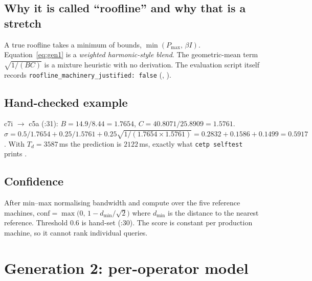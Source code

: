 \subsection{Why it is called ``roofline'' and why that is a stretch}
A true roofline takes a minimum of bounds, $\min(P_{\max},\,\beta I)$. Equation~\eqref{eq:gen1} is a
\emph{weighted harmonic-style blend}. The geometric-mean term $\sqrt{1/(BC)}$ is a mixture heuristic with no
derivation. The evaluation script itself records \texttt{roofline\_machinery\_justified: false}
(, \evFILE).

\subsection{Hand-checked example}
c7i $\to$ c5a (:31): $B=14.9/8.44=1.7654$, $C=40.8071/25.8909=1.5761$.
$\sigma=0.5/1.7654+0.25/1.5761+0.25\sqrt{1/(1.7654\times1.5761)}=0.2832+0.1586+0.1499=0.5917$.
With $T_d=3587$\,ms the prediction is $2122$\,ms, exactly what \texttt{cetp selftest} prints \evRUN.

\subsection{Confidence}
After min--max normalising bandwidth and compute over the five reference machines,
$\text{conf}=\max\!\big(0,\,1-d_{\min}/\sqrt2\big)$ where $d_{\min}$ is the distance to the nearest reference.
Threshold 0.6 is hand-set (:30). The score is constant per production machine, so it
cannot rank individual queries.

\section{Generation 2: per-operator model}
